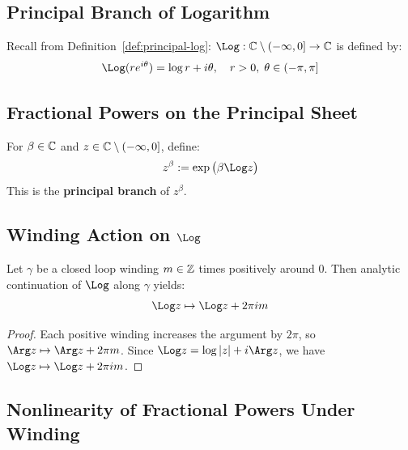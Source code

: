 \subsection{Principal Branch of Logarithm}

\begin{definition}\label{def:Log}
Recall from Definition~\ref{def:principal-log}: $\Log: \C \setminus (-\infty, 0] \to \C$ is defined by:
\begin{equation}
\Log(r e^{i\theta}) = \log r + i\theta, \quad r > 0, \; \theta \in (-\pi, \pi]
\end{equation}
\end{definition}

\subsection{Fractional Powers on the Principal Sheet}

\begin{definition}\label{def:fractional-power}
For $\beta \in \mathbb{C}$ and $z \in \mathbb{C} \setminus (-\infty, 0]$, define:
\begin{equation}
z^{\beta} := \exp\big(\beta \Log z\big)
\end{equation}
This is the \textbf{principal branch} of $z^{\beta}$.
\end{definition}

\subsection{Winding Action on $\Log$}

\begin{lemma}\label{lem:winding-log}
Let $\gamma$ be a closed loop winding $m \in \mathbb{Z}$ times positively around $0$. Then analytic continuation of $\Log$ along $\gamma$ yields:
\begin{equation}
\Log z \mapsto \Log z + 2\pi i m
\end{equation}
\end{lemma}

\begin{proof}
Each positive winding increases the argument by $2\pi$, so $\Arg z \mapsto \Arg z + 2\pi m$. Since $\Log z = \log |z| + i \Arg z$, we have $\Log z \mapsto \Log z + 2\pi i m$.
\end{proof}

\subsection{Nonlinearity of Fractional Powers Under Winding}

